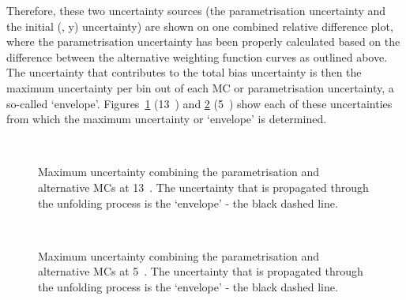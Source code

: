 Therefore, these two uncertainty sources (the parametrisation uncertainty and the initial (\ptw, y) uncertainty) are shown on one combined relative difference plot, where the parametrisation uncertainty has been properly calculated based on the difference between the alternative weighting function curves as outlined above.
The uncertainty that contributes to the total bias uncertainty is then the maximum uncertainty per bin out of each MC or parametrisation uncertainty, a so-called `envelope'. Figures~\ref{fig:Wbias_unc_env13} (13~\TeV) and \ref{fig:Wbias_unc_env5} (5~\TeV) show each of these uncertainties from which the maximum uncertainty or `envelope' is determined.

\begin{figure}[h]
  \centering
   \\
  \caption{Maximum uncertainty combining the parametrisation and alternative MCs at 13~\TeV. The uncertainty that is propagated through the unfolding process is the `envelope' - the black dashed line.}
  \label{fig:Wbias_unc_env13}
\end{figure}

\begin{figure}[h]
  \centering
   \\
  \caption{Maximum uncertainty combining the parametrisation and alternative MCs at 5~\TeV. The uncertainty that is propagated through the unfolding process is the `envelope' - the black dashed line.}
  \label{fig:Wbias_unc_env5}
\end{figure}


